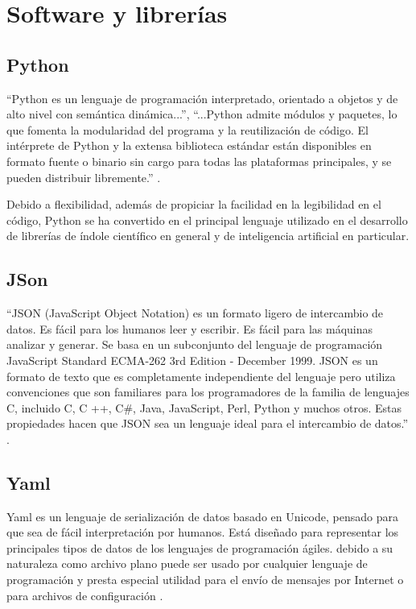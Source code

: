         
\section{Software y librerías}
\label{Sec:FrameSoftware}

    \subsection{Python}
    \label{sub:FramePython}
        ``Python es un lenguaje de programación interpretado, orientado a objetos y de alto nivel con semántica dinámica...'', ``...Python admite módulos y paquetes, lo que fomenta la modularidad del programa y la reutilización de código. El intérprete de Python y la extensa biblioteca estándar están disponibles en formato fuente o binario sin cargo para todas las plataformas principales, y se pueden distribuir libremente.'' \cite{Python2019}.
        
        Debido a flexibilidad, además de propiciar la facilidad en la legibilidad en el código, Python se ha convertido en el principal lenguaje utilizado en el desarrollo de librerías de índole científico en general y de inteligencia artificial en particular.
    
    \subsection{JSon}
    \label{sub:FrameJSon}
        ``JSON (JavaScript Object Notation) es un formato ligero de intercambio de datos. Es fácil para los humanos leer y escribir. Es fácil para las máquinas analizar y generar. Se basa en un subconjunto del lenguaje de programación JavaScript Standard ECMA-262 3rd Edition - December 1999. JSON es un formato de texto que es completamente independiente del lenguaje pero utiliza convenciones que son familiares para los programadores de la familia de lenguajes C, incluido C, C ++, C\#, Java, JavaScript, Perl, Python y muchos otros. Estas propiedades hacen que JSON sea un lenguaje ideal para el intercambio de datos.'' \cite{Json2019}.
    
    \subsection{Yaml}
    \label{sub:FrameYaml}
        Yaml es un lenguaje de serialización de datos basado en Unicode, pensado para que sea de fácil interpretación por humanos. Está diseñado para representar los principales tipos de datos de los lenguajes de programación ágiles. debido a su naturaleza como archivo plano puede ser usado por cualquier lenguaje de programación y presta especial utilidad para el envío de mensajes por Internet o para archivos de configuración \cite{Yaml2019}.
        
